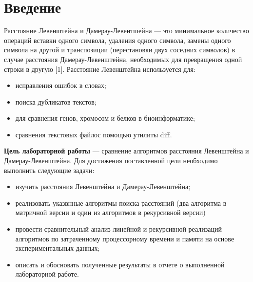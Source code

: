 \chapter*{Введение}

Расстояние Левенштейна и Дамерау-Левентшейна --- это минимальное количество операций вставки одного символа, удаления одного символа, замены одного символа на другой и транспозиции (перестановки двух соседних символов) в случае расстояния Дамерау-Левенштейна, необходимых для превращения одной строки в другую [1]. Расстояние Левенштейна используется для:
\begin{itemize}
    \item исправления ошибок в словах;
    \item поиска дубликатов текстов;
    \item для сравнения генов, хромосом и белков в биоинформатике;
    \item сравнения текстовых файлос помощью утилиты diff.
\end{itemize}

\textbf{Цель лабораторной работы} --- сравнение алгоритмов расстояния Левенштейна и Дамерау-Левенштейна. Для достижения поставленной цели необходимо выполнить следующие задачи:

\begin{itemize}
	\item изучить расстояния Левенштейна и Дамерау-Левенштейна;
	\item реализовать указвнные алгоритмы поиска расстояний (два алгоритма в матричной версии и один из алгоритмов в рекурсивной версии)
	\item провести сравнительный анализ линейной и рекурсивной реализаций алгоритмов по затраченному процессорному времени и памяти на основе экспериментальных данных;
	\item описать и обосновать полученные результаты в отчете о выполненной лабораторной работе.
\end{itemize}    